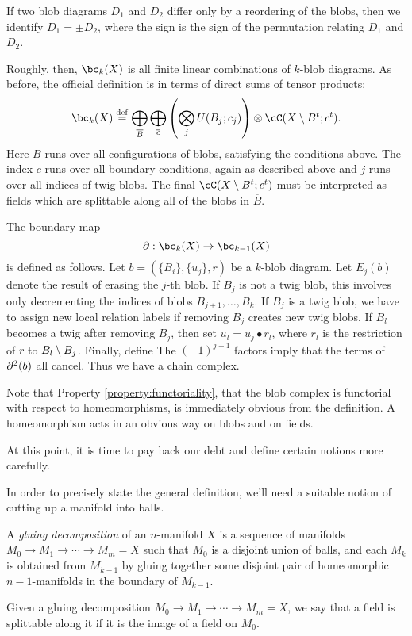 If two blob diagrams $D_1$ and $D_2$ 
differ only by a reordering of the blobs, then we identify
$D_1 = \pm D_2$, where the sign is the sign of the permutation relating $D_1$ and $D_2$.

Roughly, then, $\bc_k(X)$ is all finite linear combinations of $k$-blob diagrams.
As before, the official definition is in terms of direct sums
of tensor products:
\[
	\bc_k(X) \deq \bigoplus_{\overline{B}} \bigoplus_{\overline{c}}
		\left( \bigotimes_j U(B_j; c_j)\right) \otimes \lf(X \setmin B^t; c^t) .
\]
Here $\overline{B}$ runs over all configurations of blobs, satisfying the conditions above.
The index $\overline{c}$ runs over all boundary conditions, again as described above and $j$ runs over all indices of twig blobs.
The final $\lf(X \setmin B^t; c^t)$ must be interpreted as fields which are splittable along all of the blobs in $\overline{B}$.

The boundary map 
\[
	\bd : \bc_k(X) \to \bc_{k-1}(X)
\]
is defined as follows.
Let $b = (\{B_i\}, \{u_j\}, r)$ be a $k$-blob diagram.
Let $E_j(b)$ denote the result of erasing the $j$-th blob.
If $B_j$ is not a twig blob, this involves only decrementing
the indices of blobs $B_{j+1},\ldots,B_{k}$.
If $B_j$ is a twig blob, we have to assign new local relation labels
if removing $B_j$ creates new twig blobs. 
If $B_l$ becomes a twig after removing $B_j$, then set $u_l = u_j\bullet r_l$,
where $r_l$ is the restriction of $r$ to $B_l \setminus B_j$.
Finally, define
The $(-1)^{j+1}$ factors imply that the terms of $\partial^2(b)$ all cancel.
Thus we have a chain complex.

Note that Property \ref{property:functoriality}, that the blob complex is functorial with respect to homeomorphisms, is immediately obvious from the definition.
A homeomorphism acts in an obvious way on blobs and on fields.

At this point, it is time to pay back our debt and define certain notions more carefully.

In order to precisely state the general definition, we'll need a suitable notion of cutting up a manifold into balls.
\begin{defn}
\label{defn:gluing-decomposition}
A \emph{gluing decomposition} of an $n$-manifold $X$ is a sequence of manifolds $M_0 \to M_1 \to \cdots \to M_m = X$ such that $M_0$ is a disjoint union of balls, and each $M_k$ is obtained from $M_{k-1}$ by gluing together some disjoint pair of homeomorphic $n{-}1$-manifolds in the boundary of $M_{k-1}$.
\end{defn}
Given a gluing decomposition $M_0 \to M_1 \to \cdots \to M_m = X$, we say that a field is splittable along it if it is the image of a field on $M_0$.

